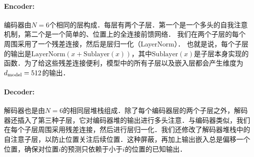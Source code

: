\paragraph{Encoder:} 编码器由$N=6$个相同的层构成．每层有两个子层．第一个是一个多头的自我注意机制，第二个是一个简单的、位置上的全连接前馈网络．  我们在两个子层的每个周围采用了一个残差连接\citep{he2016deep}，然后是层归一化（LayerNorm）\cite{layernorm2016}． 也就是说，每个子层的输出是$\mathrm{LayerNorm}(x + \mathrm{Sublayer}(x))$，其中$\mathrm{Sublayer}(x)$是子层本身实现的函数．为了给这些残差连接便利，模型中的所有子层以及嵌入层都会产生维度为$d_{\text{model}}=512$的输出．


\paragraph{Decoder:} 解码器也是由$N=6$的相同层堆栈组成．除了每个编码器层的两个子层之外，解码器还插入了第三种子层，它对编码器堆的输出进行多头注意．与编码器类似，我们在每个子层周围采用残差连接，然后进行层归一化．我们还修改了解码器堆栈中的自注意子层，以防止位置关注后续位置．这种屏蔽，再加上输出嵌入总是偏移一个位置，确保对位置$i$的预测只依赖于小于$i$的位置的已知输出．


